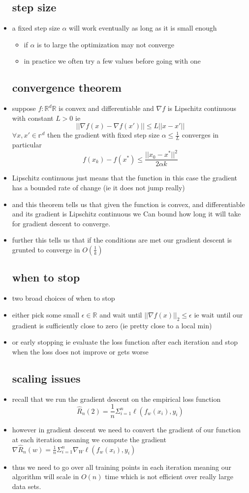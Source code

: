\documentclass{article}
\begin{document}
\begin{itemize}
\subsection{step size}
\item a fixed step size $\alpha$ will work eventually as long as it is small enough 
\begin{itemize}
    \item if $\alpha$ is to large the optimization may not converge
    \item in practice we often try a few values before going with one 
\end{itemize}
\subsection{convergence theorem}
\item suppose $f:\mathbb{R}^{d}\mathbb{R}$ is convex and differentiable and $\nabla f$ is Lipschitz continuous with constant $L>0$ ie $$||\nabla f(x)-\nabla f(x')||\leq L||x-x'||$$
$\forall x,x'\in \mathbb{r}^d$ then the gradient with fixed step size $\alpha \leq \frac{1}{L}$ converges in particular $$f(x_{k})-f(x^{*})\leq \frac{||x_{0}-x^{*}||^2}{2\alpha k}$$
\item Lipschitz continuous just means that the function in this case the gradient has a bounded rate of change (ie it does not jump really)
\item and this theorem tells us that given the function is convex, and differentiable and its gradient is Lipschitz continuous we Can bound how long it will take for gradient descent to converge.
\item further this tells us that if the conditions are met our gradient descent is grunted to converge in $O(\frac{1}{k})$
\subsection{ when to stop}
\item two broad choices of when to stop 
\item either pick some small $\epsilon \in \mathbb{R}$ and wait until $||\nabla f(x)||_{2}\leq \epsilon$ ie wait until our gradient is sufficiently close to zero (ie pretty close to a local min)
\item or early stopping ie evaluate the loss function after each iteration and stop when the loss does not improve or gets worse
\subsection{scaling issues}
\item recall that we run the gradient descent on the empirical loss function $$\hat{R}_{n}(2)=\frac{1}{n}\Sigma_{i=1}^{n}\ell(f_{w}(x_i),y_i)$$
\item however in gradient descent we need to convert the gradient of our function at each iteration meaning we compute the gradient $\nabla \hat{R}_{n}(w)=\frac{1}{n}\Sigma_{i=1}^{n}\nabla_{W}\ell(f_{w}(x_i),y_i)$
\item thus we need to go over all training points in each iteration meaning our algorithm will scale in $O(n)$ time which is not efficient over really large data sets. 

\end{itemize}
\end{document}
